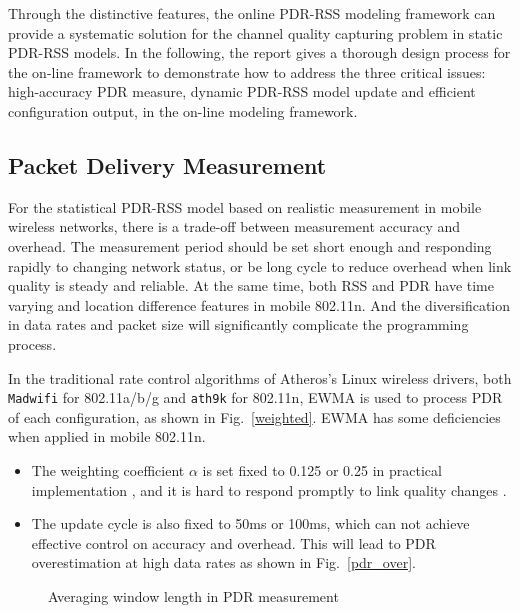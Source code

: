 \documentclass[draftclsnofoot,conference,onecolumn,11pt]{IEEEtran}
\begin{document}
Through the distinctive features, the online PDR-RSS modeling framework can provide a systematic solution for the channel quality capturing problem in static PDR-RSS models. In the following, the report gives a thorough design process for the on-line framework to demonstrate how to address the three critical issues: high-accuracy PDR measure, dynamic PDR-RSS model update and efficient configuration output, in the on-line modeling framework.

\subsection{Packet Delivery Measurement} \label{sect:methodology}
For the statistical PDR-RSS model based on realistic measurement in mobile wireless networks, there is a trade-off between measurement accuracy and overhead. The measurement period should be set short enough and responding rapidly to changing network status, or be long cycle to reduce overhead when link quality is steady and reliable. At the same time, both RSS and PDR have time varying and location difference features in mobile 802.11n. And the diversification in data rates and packet size will significantly complicate the programming process.

In the traditional rate control algorithms of Atheros's Linux wireless drivers, both \texttt{Madwifi} for 802.11a/b/g and \texttt{ath9k} \cite{ath9k} for 802.11n, EWMA is used to process PDR of each configuration, as shown in Fig.~\ref{weighted}. EWMA has some deficiencies when applied in mobile 802.11n. 

\begin{itemize}
  \item The weighting coefficient $\alpha$ is set fixed to 0.125 or 0.25 in practical implementation \cite{ath9k} \cite{minstrel}, and it is hard to respond promptly to link quality changes \cite{EWMAChart}.
  \item The update cycle is also fixed to 50ms or 100ms, which can not achieve effective control on accuracy and overhead. This will lead to PDR overestimation at high data rates as shown in Fig.~\ref{pdr_over}.
\end{itemize}

\begin{figure}[!htp]
\centerline{
}
\caption{Averaging window length in PDR measurement}
\label{method}
\end{figure}
\end{document}
